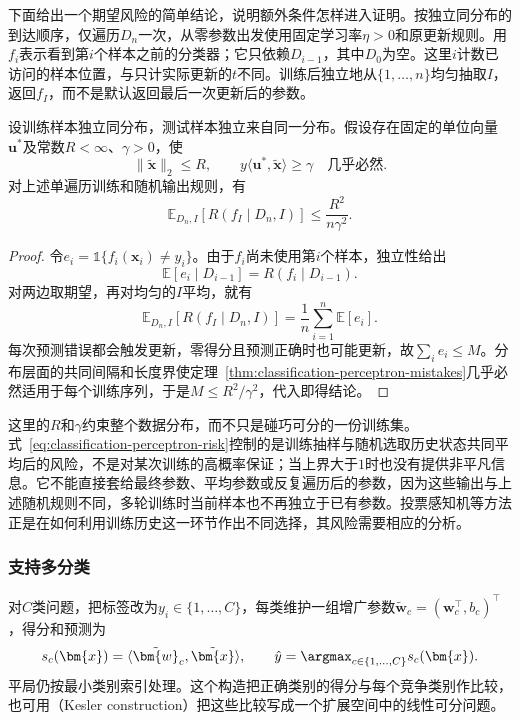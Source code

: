 下面给出一个期望风险的简单结论，说明额外条件怎样进入证明。按独立同分布的到达顺序，仅遍历$D_n$一次，从零参数出发使用固定学习率$\eta>0$和原更新规则。用$f_i$表示看到第$i$个样本之前的分类器；它只依赖$D_{i-1}$，其中$D_0$为空。这里$i$计数已访问的样本位置，与只计实际更新的$t$不同。训练后独立地从$\{1,\ldots,n\}$均匀抽取$I$，返回$f_I$，而不是默认返回最后一次更新后的参数。

\begin{theorem}[随机历史分类器的期望风险]
  \label{thm:classification-perceptron-risk}
  设训练样本独立同分布，测试样本独立来自同一分布。假设存在固定的单位向量$\bm{u}^\ast$及常数$R<\infty$、$\gamma>0$，使
  \[
    \|\tilde{\bm{x}}\|_2\leq R,\qquad
    y\langle\bm{u}^\ast,\tilde{\bm{x}}\rangle\geq\gamma
    \quad\text{几乎必然}.
  \]
  对上述单遍历训练和随机输出规则，有
  \begin{equation}
    \label{eq:classification-perceptron-risk}
    \mathbb{E}_{D_n,I}\!\left[R(f_I\mid D_n,I)\right]
      \leq\frac{R^2}{n\gamma^2}.
  \end{equation}
\end{theorem}

\begin{proof}
  令$e_i=\mathbb{1}\{f_i(\bm{x}_i)\ne y_i\}$。由于$f_i$尚未使用第$i$个样本，独立性给出
  \[
    \mathbb{E}[e_i\mid D_{i-1}]
      =R(f_i\mid D_{i-1}).
  \]
  对两边取期望，再对均匀的$I$平均，就有
  \[
    \mathbb{E}_{D_n,I}[R(f_I\mid D_n,I)]
      =\frac1n\sum_{i=1}^{n}\mathbb{E}[e_i].
  \]
  每次预测错误都会触发更新，零得分且预测正确时也可能更新，故$\sum_i e_i\leq M$。分布层面的共同间隔和长度界使定理~\ref{thm:classification-perceptron-mistakes}几乎必然适用于每个训练序列，于是$M\leq R^2/\gamma^2$，代入即得结论。
\end{proof}

这里的$R$和$\gamma$约束整个数据分布，而不只是碰巧可分的一份训练集。式~\eqref{eq:classification-perceptron-risk}控制的是训练抽样与随机选取历史状态共同平均后的风险，不是对某次训练的高概率保证；当上界大于$1$时也没有提供非平凡信息。它不能直接套给最终参数、平均参数或反复遍历后的参数，因为这些输出与上述随机规则不同，多轮训练时当前样本也不再独立于已有参数。投票感知机等方法正是在如何利用训练历史这一环节作出不同选择，其风险需要相应的分析。

\subsubsection{支持多分类}
\label{sec:classification-perceptron-multiclass}

对$C$类问题，把标签改为$y_i\in\{1,\ldots,C\}$，每类维护一组增广参数$\tilde{\bm{w}}_c=(\bm{w}_c^{\top},b_c)^{\top}$，得分和预测为
\[
  s_c(\bm{x})=\langle\tilde{\bm{w}}_c,\tilde{\bm{x}}\rangle,
  \qquad
  \hat y=\argmax_{c\in\{1,\ldots,C\}}s_c(\bm{x}).
\]
平局仍按最小类别索引处理。这个构造把正确类别的得分与每个竞争类别作比较，也可用（Kesler construction）把这些比较写成一个扩展空间中的线性可分问题。

